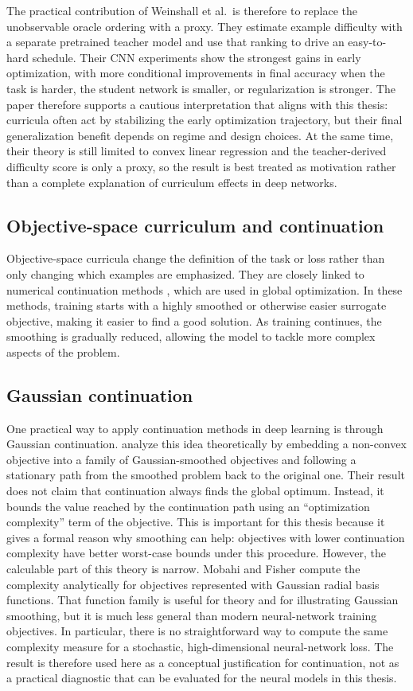 \documentclass[english,master,a4paper,oneside]{ppfcmthesis}
\begin{document}
The practical contribution of Weinshall et al.\ is therefore to replace the
unobservable oracle ordering with a proxy. They estimate example difficulty with
a separate pretrained teacher model and use that ranking to drive an
easy-to-hard schedule. Their CNN experiments show the strongest gains in early
optimization, with more conditional improvements in final accuracy when the task
is harder, the student network is smaller, or regularization is stronger. The
paper therefore supports a cautious interpretation that aligns with this thesis:
curricula often act by stabilizing the early optimization trajectory, but their
final generalization benefit depends on regime and design choices. At the same
time, their theory is still limited to convex linear regression and the
teacher-derived difficulty score is only a proxy, so the result is best treated
as motivation rather than a complete explanation of curriculum effects in deep
networks.

\subsection{Objective-space curriculum and continuation}
Objective-space curricula change the definition of the task or loss rather than
only changing which examples are emphasized. They are closely linked to
numerical continuation methods \citep{allgower1990numerical}, which are used in
global optimization. In these methods, training starts with a highly smoothed or
otherwise easier surrogate objective, making it easier to find a good solution.
As training continues, the smoothing is gradually reduced, allowing the model to
tackle more complex aspects of the problem.

\subsection{Gaussian continuation}
One practical way to apply continuation methods in deep learning is through
Gaussian continuation. \citet{mobahi2015theoretical} analyze
this idea theoretically by embedding a non-convex objective into a family of
Gaussian-smoothed objectives and following a stationary path from the smoothed
problem back to the original one. Their result does not claim that continuation
always finds the global optimum. Instead, it bounds the value reached by the
continuation path using an ``optimization complexity'' term of the objective.
This is important for this thesis because it gives a formal reason why smoothing
can help: objectives with lower continuation complexity have better worst-case
bounds under this procedure. However, the calculable part of this theory is
narrow. Mobahi and Fisher compute the complexity analytically for objectives
represented with Gaussian radial basis functions. That function family is useful
for theory and for illustrating Gaussian smoothing, but it is much less general
than modern neural-network training objectives. In particular, there is no
straightforward way to compute the same complexity measure for a stochastic,
high-dimensional neural-network loss. The result is therefore used here as a
conceptual justification for continuation, not as a practical diagnostic that can
be evaluated for the neural models in this thesis.
\end{document}

